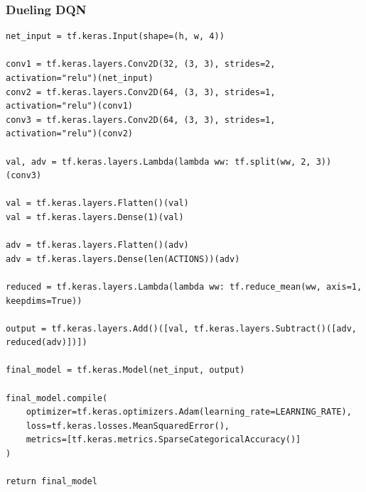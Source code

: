 \documentclass[12pt,a4paper]{article}
\begin{document}
    \subsubsection{Dueling DQN}
    \begin{lstlisting}[label={lst:dueling}]
net_input = tf.keras.Input(shape=(h, w, 4))

conv1 = tf.keras.layers.Conv2D(32, (3, 3), strides=2, activation="relu")(net_input)
conv2 = tf.keras.layers.Conv2D(64, (3, 3), strides=1, activation="relu")(conv1)
conv3 = tf.keras.layers.Conv2D(64, (3, 3), strides=1, activation="relu")(conv2)

val, adv = tf.keras.layers.Lambda(lambda ww: tf.split(ww, 2, 3))(conv3)

val = tf.keras.layers.Flatten()(val)
val = tf.keras.layers.Dense(1)(val)

adv = tf.keras.layers.Flatten()(adv)
adv = tf.keras.layers.Dense(len(ACTIONS))(adv)

reduced = tf.keras.layers.Lambda(lambda ww: tf.reduce_mean(ww, axis=1, keepdims=True))

output = tf.keras.layers.Add()([val, tf.keras.layers.Subtract()([adv, reduced(adv)])])

final_model = tf.keras.Model(net_input, output)

final_model.compile(
    optimizer=tf.keras.optimizers.Adam(learning_rate=LEARNING_RATE),
    loss=tf.keras.losses.MeanSquaredError(),
    metrics=[tf.keras.metrics.SparseCategoricalAccuracy()]
)

return final_model
    \end{lstlisting}
\end{document}
